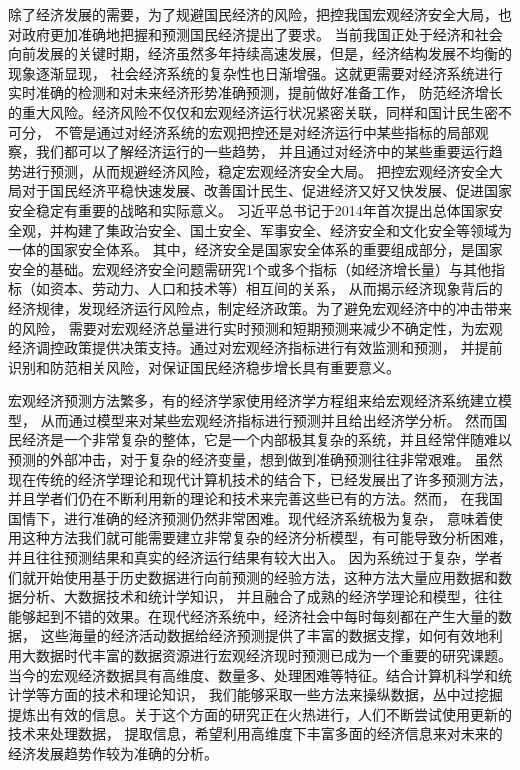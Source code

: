 除了经济发展的需要，为了规避国民经济的风险，把控我国宏观经济安全大局，也对政府更加准确地把握和预测国民经济提出了要求。
当前我国正处于经济和社会向前发展的关键时期，经济虽然多年持续高速发展，但是，经济结构发展不均衡的现象逐渐显现，
社会经济系统的复杂性也日渐增强。这就更需要对经济系统进行实时准确的检测和对未来经济形势准确预测，提前做好准备工作，
防范经济增长的重大风险。经济风险不仅仅和宏观经济运行状况紧密关联，同样和国计民生密不可分，
不管是通过对经济系统的宏观把控还是对经济运行中某些指标的局部观察，我们都可以了解经济运行的一些趋势，
并且通过对经济中的某些重要运行趋势进行预测，从而规避经济风险，稳定宏观经济安全大局。
把控宏观经济安全大局对于国民经济平稳快速发展、改善国计民生、促进经济又好又快发展、促进国家安全稳定有重要的战略和实际意义。
习近平总书记于2014年首次提出总体国家安全观，并构建了集政治安全、国土安全、军事安全、经济安全和文化安全等领域为一体的国家安全体系。
其中，经济安全是国家安全体系的重要组成部分，是国家安全的基础。宏观经济安全问题需研究1个或多个指标（如经济增长量）与其他指标（如资本、劳动力、人口和技术等）相互间的关系，
从而揭示经济现象背后的经济规律，发现经济运行风险点，制定经济政策。为了避免宏观经济中的冲击带来的风险，
需要对宏观经济总量进行实时预测和短期预测来减少不确定性，为宏观经济调控政策提供决策支持。通过对宏观经济指标进行有效监测和预测，
并提前识别和防范相关风险，对保证国民经济稳步增长具有重要意义。

宏观经济预测方法繁多，有的经济学家使用经济学方程组来给宏观经济系统建立模型，
从而通过模型来对某些宏观经济指标进行预测并且给出经济学分析。
然而国民经济是一个非常复杂的整体，它是一个内部极其复杂的系统，并且经常伴随难以预测的外部冲击，对于复杂的经济变量，想到做到准确预测往往非常艰难。
虽然现在传统的经济学理论和现代计算机技术的结合下，已经发展出了许多预测方法，并且学者们仍在不断利用新的理论和技术来完善这些已有的方法。然而，
在我国国情下，进行准确的经济预测仍然非常困难。现代经济系统极为复杂，
意味着使用这种方法我们就可能需要建立非常复杂的经济分析模型，有可能导致分析困难，并且往往预测结果和真实的经济运行结果有较大出入。
因为系统过于复杂，学者们就开始使用基于历史数据进行向前预测的经验方法，这种方法大量应用数据和数据分析、大数据技术和统计学知识，
并且融合了成熟的经济学理论和模型，往往能够起到不错的效果。在现代经济系统中，经济社会中每时每刻都在产生大量的数据，
这些海量的经济活动数据给经济预测提供了丰富的数据支撑，如何有效地利用大数据时代丰富的数据资源进行宏观经济现时预测已成为一个重要的研究课题。
当今的宏观经济数据具有高维度、数量多、处理困难等特征。结合计算机科学和统计学等方面的技术和理论知识，
我们能够采取一些方法来操纵数据，丛中过挖掘提炼出有效的信息。关于这个方面的研究正在火热进行，人们不断尝试使用更新的技术来处理数据，
提取信息，希望利用高维度下丰富多面的经济信息来对未来的经济发展趋势作较为准确的分析。

